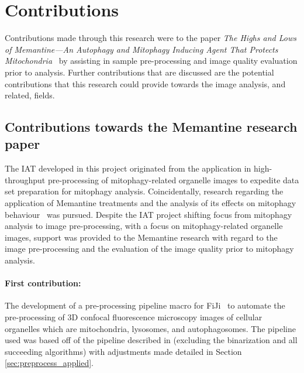 

\section{Contributions}
Contributions made through this research were to the paper \textit{The Highs and Lows of Memantine—An Autophagy and Mitophagy Inducing Agent That Protects Mitochondria}~\cite{sholto_research} by assisting in sample pre-processing and image quality evaluation prior to analysis. Further contributions that are discussed are the potential contributions that this research could provide towards the image analysis, and related, fields.
\subsection{Contributions towards the Memantine research paper}
The IAT developed in this project originated from the application in high-throughput pre-processing of mitophagy-related organelle images to expedite data set preparation for mitophagy analysis. Coincidentally, research regarding the application of Memantine treatments and the analysis of its effects on mitophagy behaviour~\cite{sholto_research} was pursued. Despite the IAT project shifting focus from mitophagy analysis to image pre-processing, with a focus on mitophagy-related organelle images, support was provided to the Memantine research with regard to the image pre-processing and the evaluation of the image quality prior to mitophagy analysis. 

\paragraph{First contribution:} 
The development of a pre-processing pipeline macro for FiJi~\cite{Fiji_paper} to automate the pre-processing of 3D confocal fluorescence microscopy images of cellular organelles which are mitochondria, lysosomes, and autophagosomes. The pipeline used was based off of the pipeline described in \cite{PipelineDecon-Chaudhry} (excluding the binarization and all succeeding algorithms) with adjustments made detailed in Section \ref{sec:preprocess_applied}.

